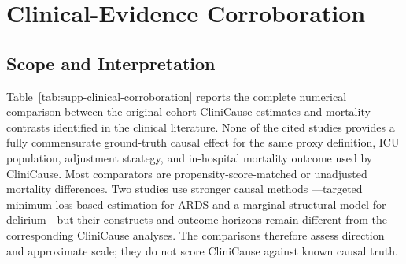 \documentclass[letterpaper,10pt]{article}
\begin{document}
\section{Clinical-Evidence Corroboration}
\label{sec:supp-clinical-corroboration}

\subsection{Scope and Interpretation}

Table~\ref{tab:supp-clinical-corroboration} reports the complete numerical
comparison between the original-cohort CliniCause estimates and mortality
contrasts identified in the clinical literature.  None of the cited studies
provides a fully commensurate ground-truth causal effect for the same proxy
definition, ICU population, adjustment strategy, and in-hospital mortality
outcome used by CliniCause.  Most comparators are propensity-score-matched or
unadjusted mortality differences.  Two studies use stronger causal methods
---targeted minimum loss-based estimation for ARDS and a marginal structural
model for delirium---but their constructs and outcome horizons remain different
from the corresponding CliniCause analyses.  The comparisons therefore assess
direction and approximate scale; they do not score CliniCause against known
causal truth.
\end{document}
